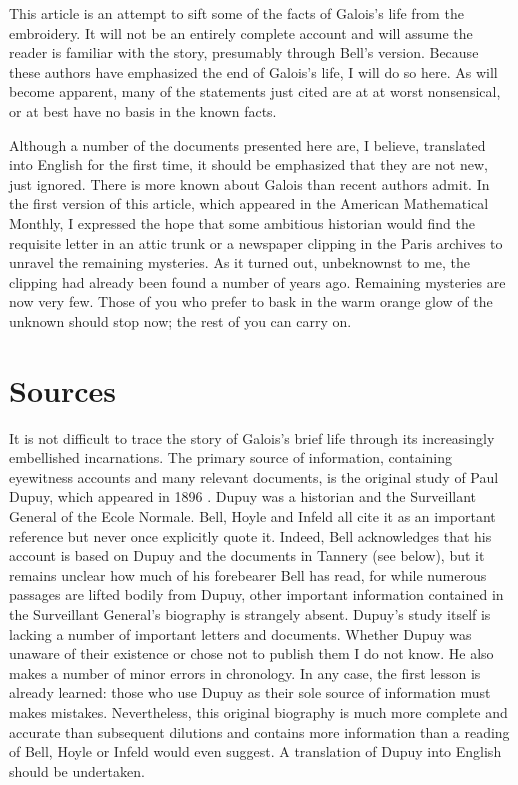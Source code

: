 \documentclass[12pt]{article}
\begin{document}
This article is an attempt to sift some of the facts of Galois's life from the embroidery. It will not be an entirely complete account and will assume the reader is familiar with the story, presumably through Bell's version. Because these authors have emphasized the end of Galois's life, I will do so here. As will become apparent, many of the statements just cited are at at worst nonsensical, or at best have no basis in the known facts.

Although a number of the documents presented here are, I believe, translated into English for the first time, it should be emphasized that they are not new, just ignored. There is more known about Galois than recent authors admit. In the first version of this article, which appeared in the American Mathematical Monthly, I expressed the hope that some ambitious historian would find the requisite letter in an attic trunk or a newspaper clipping in the Paris archives to unravel the remaining mysteries. As it turned out, unbeknownst to me, the clipping had already been found a number of years ago. Remaining mysteries are now very few. Those of you who prefer to bask in the warm orange glow of the unknown should stop now; the rest of you can carry on.

\section{Sources}

It is not difficult to trace the story of Galois's brief life through its increasingly embellished incarnations. The primary source of information, containing eyewitness accounts and many relevant documents, is the original study of Paul Dupuy, which appeared in 1896 \cite{8}. Dupuy was a historian and the Surveillant General of the Ecole Normale. Bell, Hoyle and Infeld all cite it as an important reference but never once explicitly quote it. Indeed, Bell acknowledges that his account is based on Dupuy \cite{9} and the documents in Tannery \cite{10} (see below), but it remains unclear how much of his forebearer Bell has read, for while numerous passages are lifted bodily from Dupuy, other important information contained in the Surveillant General's biography is strangely absent. Dupuy's study itself is lacking a number of important letters and documents. Whether Dupuy was unaware of their existence or chose not to publish them I do not know. He also makes a number of minor errors in chronology. In any case, the first lesson is already learned: those who use Dupuy as their sole source of information must makes mistakes. Nevertheless, this original biography is much more complete and accurate than subsequent dilutions and contains more information than a reading of Bell, Hoyle or Infeld would even suggest. A translation of Dupuy into English should be undertaken.
\end{document}

